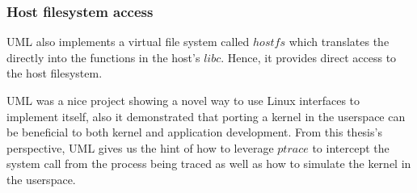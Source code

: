\subsubsection{Host filesystem access}

UML also implements a virtual file system called $hostfs$ which translates the directly into the functions in the host's $libc$. Hence, it provides direct access to the host filesystem.

UML was a nice project showing a novel way to use Linux interfaces to implement itself, also it demonstrated that porting a kernel in the userspace can be beneficial to both kernel and application development. From this thesis's perspective, UML gives us the hint of how to leverage $ptrace$ to intercept the system call from the process being traced as well as how to simulate the kernel in the userspace.




